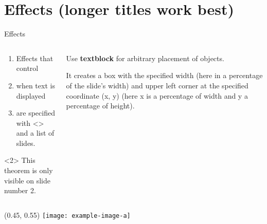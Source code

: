 \documentclass[USenglish, aspectratio = 169]{beamer}
\begin{document}
\section{Effects (longer titles work best)}

\begin{frame}{Effects}
    \begin{columns}[onlytextwidth]
        \begin{column}{0.49\textwidth}
            \begin{enumerate}[<+-|alert@+>]
                \item
                Effects that control

                \item
                when text is displayed

                \item
                are specified with <> and a list of slides.
            \end{enumerate}

            \begin{theorem}<2>
                This theorem is only visible on slide number 2.
            \end{theorem}
        \end{column}
        \begin{column}{0.49\textwidth}
            Use \textbf<2->{textblock} for arbitrary placement of objects.

            \pause
            \medskip

            It creates a box
            with the specified width (here in a percentage of the slide's width)
            and upper left corner at the specified coordinate (x, y)
            (here x is a percentage of width and y a percentage of height).
        \end{column}
    \end{columns}
    
    {
        \begin{textblock}{0.3}(0.45, 0.55)
            \texttt{[image: example-image-a]}
        \end{textblock}
    }
\end{frame}
\end{document}
